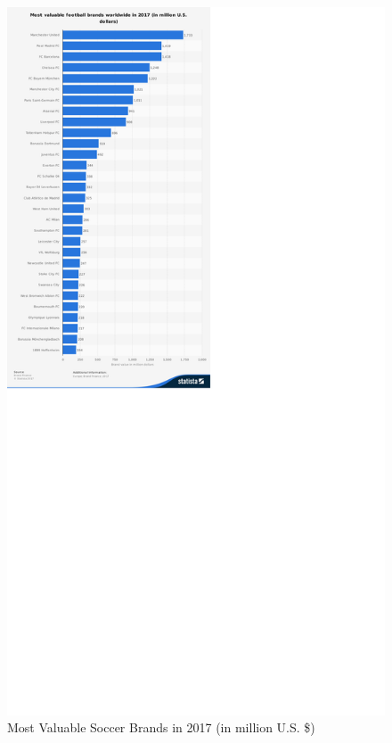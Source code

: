 \documentclass[inte,blindrev]{informs3}
\begin{document}
\begin{figure}
\FIGURE
{\includegraphics[height = 1.0\textheight, width = 1.0\textwidth]{Figure3}}
{Most Valuable Soccer Brands in 2017 (in million U.S. \$)\label{Fig3}}
{}
\end{figure}
\end{document}
